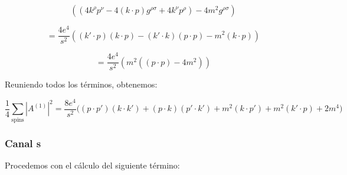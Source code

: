 \begin{equation}
((4k^\rho p^\nu - 4(k \cdot p)g^{\rho\sigma} + 4k^\nu p^\rho) - 4m^2 g^{\rho\sigma})
\end{equation}

\begin{equation}
= \frac{4e^4}{s^2} ((k' \cdot p)(k \cdot p) - (k' \cdot k) (p \cdot p) - m^2(k \cdot p))
\end{equation}

\begin{equation}
= \frac{4e^4}{s^2} (m^2 ((p \cdot p) - 4m^2))
\end{equation}

Reuniendo todos los términos, obtenemos:

\begin{equation}
\frac{1}{4} \sum_{\text{spins}} |A^{(1)}|^2 = \frac{8e^4}{s^2} \bigg( (p \cdot p')(k \cdot k') + (p \cdot k)(p' \cdot k') + m^2(k \cdot p') + m^2(k' \cdot p) + 2m^4 \bigg)
\end{equation}

\subsubsection{Canal s}
Procedemos con el cálculo del siguiente término:


